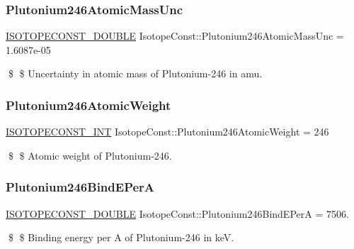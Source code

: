 \subsubsection{\texorpdfstring{Plutonium246\+Atomic\+Mass\+Unc}{Plutonium246AtomicMassUnc}}
{\footnotesize\ttfamily \mbox{\hyperlink{group___isotope_const-_macros_ga8f45a7272ce02c0b4c65c44636ed719a}{I\+S\+O\+T\+O\+P\+E\+C\+O\+N\+S\+T\+\_\+\+D\+O\+U\+B\+LE}} Isotope\+Const\+::\+Plutonium246\+Atomic\+Mass\+Unc = 1.\+6087e-\/05}

\$ \$ Uncertainty in atomic mass of Plutonium-\/246 in amu. \mbox{\label{group___isotope_const-_plutonium-_pu246_gaa60fcc0ded2e24c981eaa7281117309a}} 
\subsubsection{\texorpdfstring{Plutonium246\+Atomic\+Weight}{Plutonium246AtomicWeight}}
{\footnotesize\ttfamily \mbox{\hyperlink{group___isotope_const-_macros_ga5f18360b3e99483a35c32d789e62621c}{I\+S\+O\+T\+O\+P\+E\+C\+O\+N\+S\+T\+\_\+\+I\+NT}} Isotope\+Const\+::\+Plutonium246\+Atomic\+Weight = 246}

\$ \$ Atomic weight of Plutonium-\/246. \mbox{\label{group___isotope_const-_plutonium-_pu246_ga6d670e26eed3ffe7d6f1cb70786ec358}} 
\subsubsection{\texorpdfstring{Plutonium246\+Bind\+E\+PerA}{Plutonium246BindEPerA}}
{\footnotesize\ttfamily \mbox{\hyperlink{group___isotope_const-_macros_ga8f45a7272ce02c0b4c65c44636ed719a}{I\+S\+O\+T\+O\+P\+E\+C\+O\+N\+S\+T\+\_\+\+D\+O\+U\+B\+LE}} Isotope\+Const\+::\+Plutonium246\+Bind\+E\+PerA = 7506.}

\$ \$ Binding energy per A of Plutonium-\/246 in keV. \mbox{\label{group___isotope_const-_plutonium-_pu246_ga771a812b828dd2e97037467c7395f464}} 
